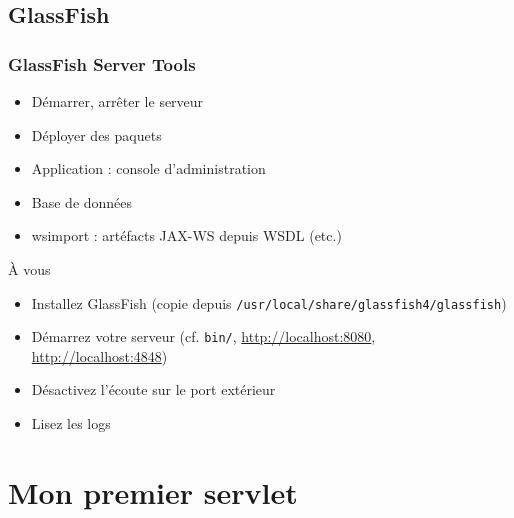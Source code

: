 \documentclass[english, french]{beamer}
\begin{document}
\subsection{GlassFish}
\begin{frame}
	\frametitle{GlassFish Server Tools}
	\begin{itemize}
		\item Démarrer, arrêter le serveur
		\item Déployer des paquets
		\item Application : console d’administration
		\item Base de données
		\item wsimport : artéfacts JAX-WS depuis WSDL (etc.)
	\end{itemize}
	\begin{block}{À vous}
		\begin{itemize}
			\item Installez GlassFish (copie depuis \texttt{/usr/local/share/glassfish4/glassfish})
			\item Démarrez votre serveur (cf. \texttt{bin/}, \url{http://localhost:8080}, \url{http://localhost:4848})
			\item Désactivez l’écoute sur le port extérieur
			\item Lisez les logs
		\end{itemize}
	\end{block}
\end{frame}

\section[Un servlet]{Mon premier servlet}
\end{document}
